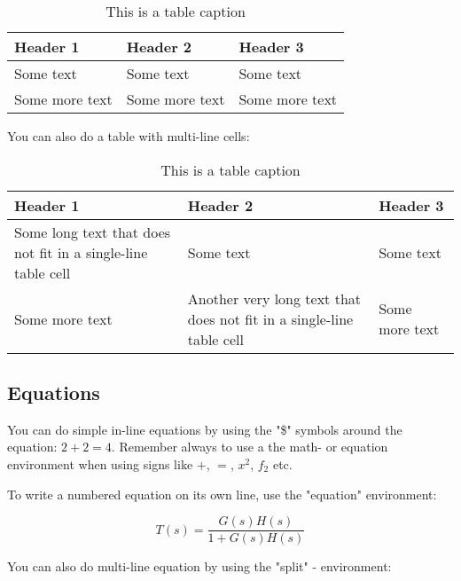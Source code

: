 \begin{table}[H]
\centering
\caption{This is a table caption}
\label{tab:table1_label}
\begin{tabular}{|l|l|l|} %
\hline %
\textbf{Header 1} & \textbf{Header 2} & \textbf{Header 3}\\ %
\hline 
Some text & Some text & Some text\\
Some more text & Some more text & Some more text\\
\hline
\end{tabular}
\end{table}

You can also do a table with multi-line cells:

\begin{table}[H]
\centering
\caption{This is a table caption}
\label{tab:table2_label}
\begin{tabular}{|p{}p{}p{}|}
\hline
\textbf{Header 1} &  \textbf{Header 2} & \textbf{Header 3}\\ 
\hline
Some long text that does not fit in a single-line table cell & Some text & Some text \\
Some more text & Another very long text that does not fit in a single-line table cell & Some more text\\
\hline
\end{tabular}
\end{table}


\subsection{Equations}

You can do simple in-line equations by using the "\$" symbols around the equation: $2+2=4$. Remember always to use a the math- or equation environment when using signs like $+$, $=$, $x^{2}$, $f_{2}$ etc.

To write a numbered equation on its own line, use the "equation" environment: 

\begin{equation}
\label{eq:equation1_label}
T(s)=\frac{G(s)H(s)}{1+G(s)H(s)}
\end{equation}

You can also do multi-line equation by using the "split" - environment:

